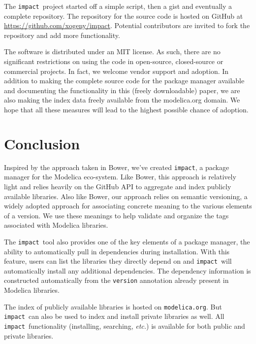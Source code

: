 \documentclass[11pt,a4paper,twocolumn]{article}
\newcommand{\impact}{\texttt{impact}} %
\newcommand{\code}[1]{\texttt{#1}} %
\begin{document}
The \impact\ project started off a simple script, then a gist and
eventually a complete repository.  The repository for the source code
is hosted on GitHub at \url{https://github.com/xogeny/impact}.
Potential contributors are invited to fork the repository and add more
functionality.

The software is distributed under an MIT license.  As such, there are
no significant restrictions on using the code in open-source,
closed-source or commercial projects.  In fact, we welcome vendor
support and adoption.  In addition to making the complete source code
for the package manager available and documenting the functionality
in this (freely downloadable) paper, we are also making the index data
freely available from the modelica.org domain.  We hope that all these
measures will lead to the highest possible chance of adoption.

\section{Conclusion}
\label{sec:conclusion}


Inspired by the approach taken in Bower, we've created \impact, a
package manager for the Modelica eco-system.  Like Bower, this
approach is relatively light and relies heavily on the GitHub API to
aggregate and index publicly available libraries.  Also like Bower,
our approach relies on semantic versioning, a widely adopted approach
for associating concrete meaning to the various elements of a version.
We use these meanings to help validate and organize the tags
associated with Modelica libraries.

The \impact\ tool also provides one of the key elements of a package
manager, the ability to automatically pull in dependencies during
installation.  With this feature, users can list the libraries they
directly depend on and \impact\ will automatically install any
additional dependencies.  The dependency information is constructed
automatically from the \code{version} annotation already present in
Modelica libraries.

The index of publicly available libraries is hosted on
\code{modelica.org}.  But \impact\ can also be used to index and
install private libraries as well.  All \impact\ functionality
(installing, searching, \textit{etc.}) is available for both public
and private libraries.

\printbibliography
\end{document}

